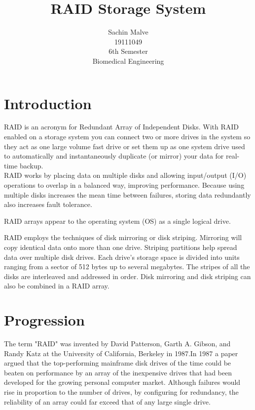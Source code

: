 \documentclass{article}
\begin{document}
\title{RAID Storage System}


\author{Sachin Malve \\
	19111049 \\
 	6th Semester \\ 
	Biomedical Engineering\\
	}

\maketitle 
 \hrulefill

\section{Introduction}
 RAID is an acronym for Redundant Array of Independent Disks. With RAID enabled on a storage system you can connect two or more drives in the system so they act as one large volume fast drive or set them up as one system drive used to automatically and instantaneously duplicate (or mirror) your data for real-time backup. \\
 RAID works by placing data on multiple disks and allowing input/output (I/O) operations to overlap in a balanced way, improving performance. Because using multiple disks increases the mean time between failures, storing data redundantly also increases fault tolerance.

RAID arrays appear to the operating system (OS) as a single logical drive.

RAID employs the techniques of disk mirroring or disk striping. Mirroring will copy identical data onto more than one drive. Striping partitions help spread data over multiple disk drives. Each drive's storage space is divided into units ranging from a sector of 512 bytes up to several megabytes. The stripes of all the disks are interleaved and addressed in order. Disk mirroring and disk striping can also be combined in a RAID array.

\section{Progression}
The term "RAID" was invented by David Patterson, Garth A. Gibson, and Randy Katz at the University of California, Berkeley in 1987.In 1987 a paper  argued that the top-performing mainframe disk drives of the time could be beaten on performance by an array of the inexpensive drives that had been developed for the growing personal computer market. Although failures would rise in proportion to the number of drives, by configuring for redundancy, the reliability of an array could far exceed that of any large single drive.
\end{document}

